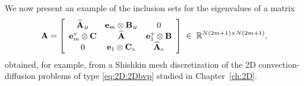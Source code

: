 %
We now present an example of the inclusion sets for the eigenvalues of a  matrix
\begin{equation}\label{eq:BDiDo:ConvDiffMat}
\mathbf{A}=\left[
  \begin{array}{ccc}
             \widehat{\mathbf{A}}_{\scriptscriptstyle H}       & \mathbf{e}_{m}\otimes\mathbf{B}_{\scriptscriptstyle H}   &    0            \\
    \mathbf{e}_{m}^{\scriptscriptstyle T}\otimes\mathbf{C}  &   \widehat{\mathbf{A}}      & \mathbf{e}_{1}^{\scriptscriptstyle T}\otimes\mathbf{B} \\
                   0         & \mathbf{e}_{1}\otimes\mathbf{C}_{\scriptscriptstyle h} &        \widehat{\mathbf{A}}_{\scriptscriptstyle h}  \\
  \end{array}
\right]\;\in\;{\mathbb R}^{N(2m+1)\times N(2m+1)},
\end{equation}
obtained, for example, from a Shishkin mesh discretization of the 2D convection-diffusion problems of type \eqref{eq:2D:2Dbvp} studied in Chapter~\ref{ch:2D}.

